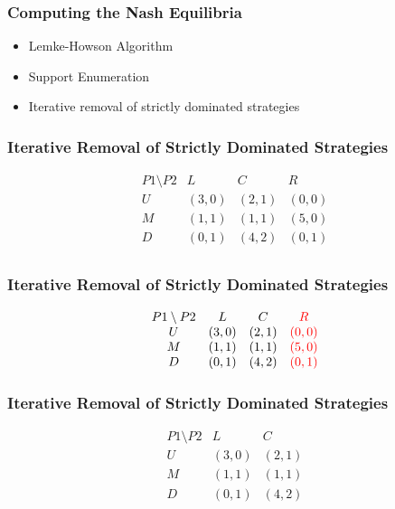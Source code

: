 \begin{frame}
    \frametitle{Computing the Nash Equilibria}
    \begin{itemize}
        \item Lemke-Howson Algorithm
        \item Support Enumeration 
        \item Iterative removal of strictly dominated strategies
    \end{itemize}

\end{frame}


\begin{frame}
    \frametitle{Iterative Removal of Strictly Dominated Strategies}
    \begin{equation*}
        \begin{matrix}
            P1\setminus P2 & L & C & R \\
            U & (3,0) & (2,1) & (0,0) \\
            M & (1,1) & (1,1) & (5,0) \\
            D & (0,1) & (4,2) & (0,1) \\
        \end{matrix}
    \end{equation*}
\end{frame}


\begin{frame}
    \frametitle{Iterative Removal of Strictly Dominated Strategies}
    \begin{equation*}
        \begin{matrix}
            P1\setminus P2 & L & C & \textcolor{red}{R} \\
            U & (3,0) & (2,1) & \textcolor{red}{(0,0)} \\
            M & (1,1) & (1,1) & \textcolor{red}{(5,0)} \\
            D & (0,1) & (4,2) & \textcolor{red}{(0,1)} \\
        \end{matrix}
    \end{equation*}
\end{frame}


\begin{frame}
    \frametitle{Iterative Removal of Strictly Dominated Strategies}
    \begin{equation*}
        \begin{matrix}
            P1\setminus P2 & L & C \\
            U & (3,0) & (2,1) \\
            M & (1,1) & (1,1) \\
            D & (0,1) & (4,2) \\
        \end{matrix}
    \end{equation*}
\end{frame}


